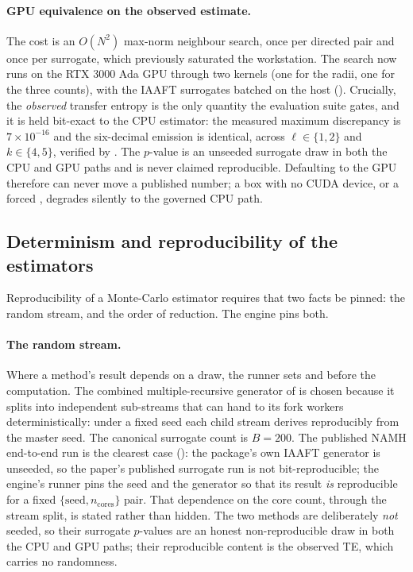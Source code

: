 \paragraph{GPU equivalence on the observed estimate.}
The cost is an $O(N^2)$ max-norm neighbour search, once per directed pair and once per
surrogate, which previously saturated the workstation. The search now runs on the
RTX 3000 Ada GPU through two  kernels (one for the radii, one for
the three counts), with the IAAFT surrogates batched on the host
(). Crucially, the \emph{observed} transfer entropy is the only
quantity the evaluation suite gates, and it is held bit-exact to the CPU estimator:
the measured maximum discrepancy is $7\times10^{-16}$ and the six-decimal emission is
identical, across $\ell\in\{1,2\}$ and $k\in\{4,5\}$, verified by
. The $p$-value is an unseeded surrogate draw in both the CPU
and GPU paths and is never claimed reproducible. Defaulting to the GPU therefore can
never move a published number; a box with no CUDA device, or a forced ,
degrades silently to the governed CPU path.

\subsection{Determinism and reproducibility of the estimators}
\label{sec:determinism}

Reproducibility of a Monte-Carlo estimator requires that two facts be pinned: the
random stream, and the order of reduction. The engine pins both.

\paragraph{The random stream.}
Where a method's result depends on a draw, the runner sets
 and  before the computation. The
combined multiple-recursive generator of \citet{lecuyer1999} is chosen because it
splits into independent sub-streams that  can hand to its
fork workers deterministically: under a fixed seed each child stream derives
reproducibly from the master seed. The canonical surrogate count is $B=200$. The
published NAMH end-to-end run is the clearest case (): the
 package's own IAAFT generator is unseeded, so the paper's published
surrogate run is not bit-reproducible; the engine's runner pins the seed and the
generator so that its result \emph{is} reproducible for a fixed
$\{\text{seed}, n_{\text{cores}}\}$ pair. That dependence on the core count, through
the stream split, is stated rather than hidden. The two  methods are
deliberately \emph{not} seeded, so their surrogate $p$-values are an honest
non-reproducible draw in both the CPU and GPU paths; their reproducible content is the
observed TE, which carries no randomness.

